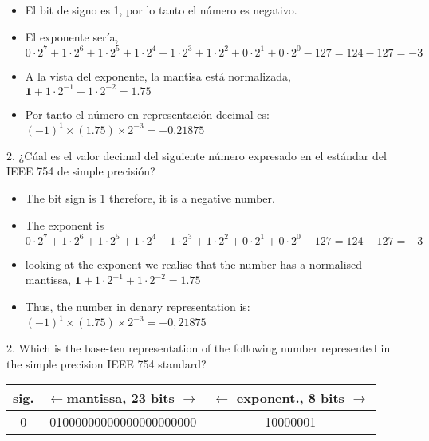 \begin{paracol}{2}
\begin{itemize}[leftmargin=\dimexpr 26pt-.25in]
\item El bit de signo es 1, por lo tanto el número es negativo.
\item El exponente sería, $0\cdot2^7+1\cdot2^6+1\cdot2^5+1\cdot2^4+1\cdot2^3+1\cdot2^2+0\cdot2^1+0\cdot2^0-127=124-127=-3$
\item A la vista del exponente, la mantisa está normalizada, $\mathbf{1}+1\cdot2^{-1}+1\cdot2^{-2}=1.75$
\item Por tanto el número en representación decimal es: $ (-1)^1\times(1.75)\times2^{-3}=-0.21875$
\end{itemize}

2. ¿Cúal es el valor decimal del siguiente número expresado en el estándar del IEEE 754 de simple precisión?
\switchcolumn
\begin{itemize}[leftmargin=\dimexpr 26pt-.25in]
	\item The bit sign is 1 therefore, it is a negative number.
	\item The exponent is  $0\cdot2^7+1\cdot2^6+1\cdot2^5+1\cdot2^4+1\cdot2^3+1\cdot2^2+0\cdot2^1+0\cdot2^0-127=124-127=-3$
	\item looking at the exponent we realise that the number has a normalised mantissa, $\mathbf{1}+1\cdot2^{-1}+1\cdot2^{-2}=1.75$
	\item Thus, the number in denary representation is: $ (-1)^1\times(1.75)\times2^{-3}=-0,21875$
\end{itemize}

2. Which is the base-ten representation of the following number represented in the simple precision IEEE 754 standard? 
\end{paracol}
\begin{minipage}{\textwidth}
\centering
\begin{tabular}{|c||c||c|}
\hline
sig.&$\leftarrow$mantissa, 23 bits $\rightarrow$&$\leftarrow$ exponent., 8 bits $\rightarrow$\\
\hline
0&01000000000000000000000&10000001\\
\hline
\end{tabular}\\
\end{minipage}
